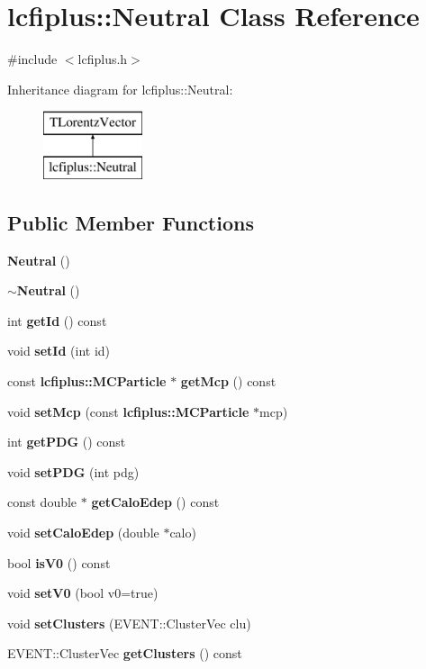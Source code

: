 \section{lcfiplus\-:\-:Neutral Class Reference}
\label{classlcfiplus_1_1Neutral}


{\ttfamily \#include $<$lcfiplus.\-h$>$}

Inheritance diagram for lcfiplus\-:\-:Neutral\-:\begin{figure}[H]
\begin{center}
\leavevmode
\includegraphics[height=2.000000cm]{classlcfiplus_1_1Neutral}
\end{center}
\end{figure}
\subsection*{Public Member Functions}
\begin{DoxyCompactItemize}
\item 
{\bf Neutral} ()
\item 
{\bf $\sim$\-Neutral} ()
\item 
int {\bf get\-Id} () const 
\item 
void {\bf set\-Id} (int id)
\item 
const {\bf lcfiplus\-::\-M\-C\-Particle} $\ast$ {\bf get\-Mcp} () const 
\item 
void {\bf set\-Mcp} (const {\bf lcfiplus\-::\-M\-C\-Particle} $\ast$mcp)
\item 
int {\bf get\-P\-D\-G} () const 
\item 
void {\bf set\-P\-D\-G} (int pdg)
\item 
const double $\ast$ {\bf get\-Calo\-Edep} () const 
\item 
void {\bf set\-Calo\-Edep} (double $\ast$calo)
\item 
bool {\bf is\-V0} () const 
\item 
void {\bf set\-V0} (bool v0=true)
\item 
void {\bf set\-Clusters} (E\-V\-E\-N\-T\-::\-Cluster\-Vec clu)
\item 
E\-V\-E\-N\-T\-::\-Cluster\-Vec {\bf get\-Clusters} () const 
\end{DoxyCompactItemize}


